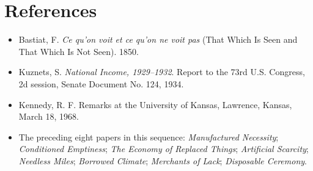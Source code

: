 \documentclass[11pt]{article}
\begin{document}
\section*{References}
\begin{itemize}[nosep]
\item Bastiat, F. \emph{Ce qu'on voit et ce qu'on ne voit pas} (That Which Is Seen and That Which Is Not Seen). 1850.
\item Kuznets, S. \emph{National Income, 1929--1932}. Report to the 73rd U.S. Congress, 2d session, Senate Document No. 124, 1934.
\item Kennedy, R. F. Remarks at the University of Kansas, Lawrence, Kansas, March 18, 1968.
\item The preceding eight papers in this sequence: \emph{Manufactured Necessity}; \emph{Conditioned Emptiness}; \emph{The Economy of Replaced Things}; \emph{Artificial Scarcity}; \emph{Needless Miles}; \emph{Borrowed Climate}; \emph{Merchants of Lack}; \emph{Disposable Ceremony}.
\end{itemize}
\end{document}
